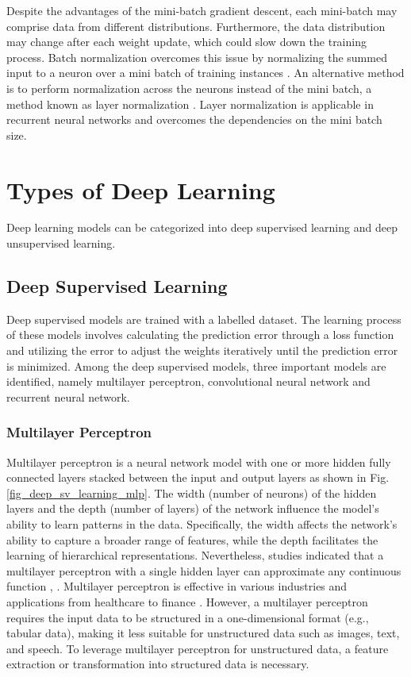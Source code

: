 \documentclass[preprint,12pt]{elsarticle}
\begin{document}
Despite the advantages of the mini-batch gradient descent, each mini-batch may comprise data from different distributions. Furthermore, the data distribution may change after each weight update, which could slow down the training process. Batch normalization overcomes this issue by normalizing the summed input to a neuron over a mini batch of training instances \citep{ioffe_batch_2015}. An alternative method is to perform normalization across the neurons instead of the mini batch, a method known as layer normalization \citep{ba_layer_2016}. Layer normalization is applicable in recurrent neural networks and overcomes the dependencies on the mini batch size.

\section{Types of Deep Learning}\label{sec3}
Deep learning models can be categorized into deep supervised learning and deep unsupervised learning.

\subsection{Deep Supervised Learning}
Deep supervised models are trained with a labelled dataset. The learning process of these models involves calculating the prediction error through a loss function and utilizing the error to adjust the weights iteratively until the prediction error is minimized. Among the deep supervised models, three important models are identified, namely multilayer perceptron, convolutional neural network and recurrent neural network. 

\subsubsection{Multilayer Perceptron} 
Multilayer perceptron is a neural network model with one or more hidden fully connected layers stacked between the input and output layers as shown in Fig. \ref{fig_deep_sv_learning_mlp}. The width (number of neurons) of the hidden layers and the depth (number of layers) of the network influence the model’s ability to learn patterns in the data. Specifically, the width affects the network’s ability to capture a broader range of features, while the depth facilitates the learning of hierarchical representations. Nevertheless, studies indicated that a multilayer perceptron with a single hidden layer can approximate any continuous function \citep{cybenko_approximation_1989}, \citep{hornik_multilayer_1989}. Multilayer perceptron is effective in various industries and applications from healthcare to finance \citep{widrow_neural_1994}. However, a multilayer perceptron requires the input data to be structured in a one-dimensional format (e.g., tabular data), making it less suitable for unstructured data such as images, text, and speech. To leverage multilayer perceptron for unstructured data, a feature extraction or transformation into structured data is necessary.
\end{document}
